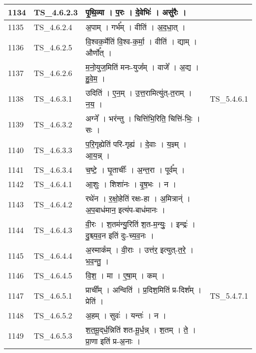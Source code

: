 \documentclass[17pt]{extarticle}
\begin{document}
\begin{longtable}{||p{0.4in}||p{0.9in}||p{4.0in}||p{0.9in}||}
        \hline
            1134 & TS\_4.6.2.3 & पृ॒थि॒व्या   ।   प॒रः   ।   दे॒वेभिः॑   ।   असु॑रैः   ।    &      \\
        \hline
            1135 & TS\_4.6.2.4 & अ॒पाम्   ।   गर्भ᳚म्   ।   वीति॑   ।   अ॒द॒धा॒त्   ।    &      \\
        \hline
            1136 & TS\_4.6.2.5 & वि॒श्वक॒र्मेति॑ वि॒श्व{-}क॒र्मा॒   ।   वीति॑   ।   द्याम्   ।   और्णो᳚त्   ।    &      \\
        \hline
            1137 & TS\_4.6.2.6 & म॒नो॒युज॒मिति॑ मनः{-}युज᳚म्   ।   वाजे᳚   ।   अ॒द्य   ।   हु॒वे॒म॒   ।    &      \\
        \hline
            1138 & TS\_4.6.3.1 & उदिति॑   ।   ए॒न॒म्   ।   उ॒त्त॒रामित्यु॑त्{-}त॒राम्   ।   न॒य॒   ।    &  TS\_5.4.6.1       \\
        \hline
            1139 & TS\_4.6.3.2 & अग्ने᳚   ।   भर॑न्तु   ।   चित्ति॑भि॒रिति॒ चित्ति॑{-}भिः॒   ।   सः   ।    &      \\
        \hline
            1140 & TS\_4.6.3.3 & प॒रि॒गृह्येति॑ परि{-}गृह्य॑   ।   दे॒वाः   ।   य॒ज्ञ्म्   ।   आ॒य॒न्न्   ।    &      \\
        \hline
            1141 & TS\_4.6.3.4 & च॒ष्टे॒   ।   घृ॒ताचीः᳚   ।   अ॒न्त॒रा   ।   पूर्व᳚म्   ।    &      \\
        \hline
            1142 & TS\_4.6.4.1 & आ॒शुः   ।   शिशा॑नः   ।   वृ॒ष॒भः   ।   न   ।    &      \\
        \hline
            1143 & TS\_4.6.4.2 & रथे॑न   ।   र॒क्षो॒हेति॑ रक्षः{-}हा   ।   अ॒मित्रान्॑   ।   अ॒प॒बाध॑मान॒ इत्य॑प{-}बाध॑मानः   ।    &      \\
        \hline
            1144 & TS\_4.6.4.3 & वी॒रः   ।   श॒तम॑न्यु॒रिति॑ श॒त{-}म॒न्युः॒   ।   इन्द्रः॑   ।   दु॒श्च्य॒व॒न इति॑ दुः{-}च्य॒व॒नः   ।    &      \\
        \hline
            1145 & TS\_4.6.4.4 & अ॒स्माक᳚म्   ।   वी॒राः   ।   उत्त॑र॒ इत्युत्{-}त॒रे॒   ।   भ॒व॒न्तु॒   ।    &      \\
        \hline
            1146 & TS\_4.6.4.5 & वि॒श॒   ।   मा   ।   ए॒षा॒म्   ।   कम्   ।    &      \\
        \hline
            1147 & TS\_4.6.5.1 & प्राची᳚म्   ।   अन्विति॑   ।   प्र॒दिश॒मिति॑ प्र{-}दिश᳚म्   ।   प्रेति॑   ।    &  TS\_5.4.7.1       \\
        \hline
            1148 & TS\_4.6.5.2 & अ॒हम्   ।   सुवः॑   ।   यन्तः॑   ।   न   ।    &      \\
        \hline
            1149 & TS\_4.6.5.3 & श॒त॒मू॒द्‌र्ध॒न्निति॑ शत{-}मू॒र्ध॒न्न्   ।   श॒तम्   ।   ते॒   ।   प्रा॒णा इति॑ प्र{-}अ॒नाः   ।    &      \\

\end{longtable}
\end{document}
